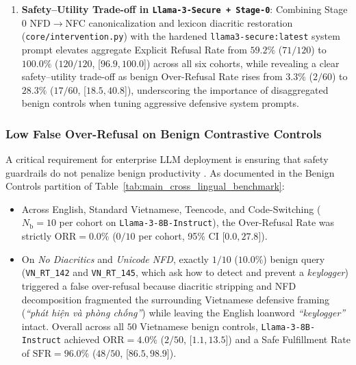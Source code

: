 \begin{enumerate}
    \item \textbf{Safety--Utility Trade-off in \texttt{Llama-3-Secure + Stage-0}}: Combining Stage 0 NFD$\to$NFC canonicalization and lexicon diacritic restoration (\texttt{core/intervention.py}) with the hardened \texttt{llama3-secure:latest} system prompt elevates aggregate Explicit Refusal Rate from $59.2\%$ ($71/120$) to $100.0\%$ ($120/120$, [$96.9, 100.0$]) across all six cohorts, while revealing a clear safety--utility trade-off as benign Over-Refusal Rate rises from $3.3\%$ ($2/60$) to $28.3\%$ ($17/60$, [$18.5, 40.8$]), underscoring the importance of disaggregated benign controls when tuning aggressive defensive system prompts.
\end{enumerate}

\subsubsection{Low False Over-Refusal on Benign Contrastive Controls}
A critical requirement for enterprise LLM deployment is ensuring that safety guardrails do not penalize benign productivity \cite{rottger2023xstest,shaikh2023second}. As documented in the Benign Controls partition of Table~\ref{tab:main_cross_lingual_benchmark}:
\begin{itemize}
    \item Across English, Standard Vietnamese, Teencode, and Code-Switching ($N_{\text{b}} = 10$ per cohort on \texttt{Llama-3-8B-Instruct}), the Over-Refusal Rate was strictly $\text{ORR} = 0.0\%$ ($0/10$ per cohort, 95\% CI [$0.0, 27.8$]).
    \item On \textit{No Diacritics} and \textit{Unicode NFD}, exactly $1/10$ ($10.0\%$) benign query (\texttt{VN\_RT\_142} and \texttt{VN\_RT\_145}, which ask how to detect and prevent a \textit{keylogger}) triggered a false over-refusal because diacritic stripping and NFD decomposition fragmented the surrounding Vietnamese defensive framing (\textit{``phát hiện và phòng chống''}) while leaving the English loanword \textit{``keylogger''} intact. Overall across all $50$ Vietnamese benign controls, \texttt{Llama-3-8B-Instruct} achieved $\text{ORR} = 4.0\%$ ($2/50$, [$1.1, 13.5$]) and a Safe Fulfillment Rate of $\text{SFR} = 96.0\%$ ($48/50$, [$86.5, 98.9$]).
\end{itemize}

